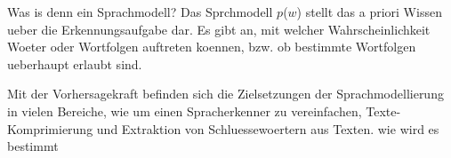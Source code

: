 
Was is denn ein Sprachmodell? Das Sprchmodell $p$($w$) stellt das a priori Wissen ueber die Erkennungsaufgabe dar.
Es gibt an, mit welcher Wahrscheinlichkeit Woeter oder Wortfolgen auftreten koennen, bzw. 
ob bestimmte Wortfolgen ueberhaupt erlaubt sind. 

Mit der Vorhersagekraft befinden sich die Zielsetzungen der Sprachmodellierung  in vielen Bereiche, wie um einen Spracherkenner zu vereinfachen, Texte-Komprimierung und Extraktion von Schluessewoertern aus Texten.
wie wird es bestimmt
